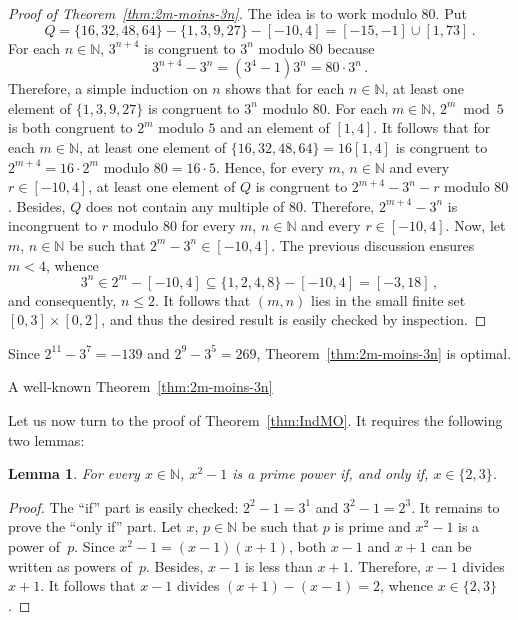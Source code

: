 \documentclass[12pt]{article}
\newcommand{\bZ}{\mathbb{Z}}
\newcommand{\bN}{\mathbb{N}} %
\newtheorem{lemma}{Lemma}
\theoremstyle{definition}
\begin{document}
   \begin{proof}[Proof of Theorem~\ref{thm:2m-moins-3n}]
     The idea is to work modulo $80$.
     Put  
     $$
     Q  = \{ 16, 32, 48, 64 \}  - \{ 1, 3, 9, 27 \}  - [- 10, 4] = [-15, - 1] \cup [1, 73] \,.
     $$
     For each $n \in \bN$,
     $3^{n + 4}$ is congruent to $3^n$ modulo $80$ because 
     $$3^{n + 4} - 3^n =  (3^4 - 1) 3^n = 80 \cdot  3^n \, .
     $$
     Therefore,
     a simple induction on $n$ shows that for each $n \in \bN$,
     at least one element of $\{ 1, 3, 9, 27 \}$ is congruent to $3^n$ modulo $80$.
     For each $m \in \bN$,
     $2^m \bmod 5$
     is both congruent to $2^m$ modulo $5$ and an element of $[1, 4]$.
     It follows that for each $m \in \bN$,
     at least one element of
     $\{ 16, 32, 48, 64 \} = 16 [1, 4]$ is congruent to $2^{m + 4}  = 16  \cdot 2^m$ modulo $80 = 16 \cdot 5$.
     Hence, for every $m$, $n \in \bN$ and every $r \in [-10, 4]$, 
     at least one element of $Q$ is congruent to $2^{m + 4} - 3^n - r$ modulo $80$.
     Besides, $Q$ does not contain any multiple of $80$.
     Therefore,
     $2^{m + 4}  - 3^n$ is incongruent to $r$ modulo $80$
     for every $m$, $n \in \bN$ and every $r \in [- 10, 4]$.
     Now, let $m$, $n \in \bN$ be such that $2^m - 3^n \in [-10, 4]$.
     The previous discussion ensures $m < 4$,
     whence  
     $$
     3^n \in 2^m - [- 10, 4] \subseteq \{ 1, 2, 4, 8 \} - [- 10, 4] = [ -3, 18] \, ,
     $$
     and consequently, $n \le 2$.
     It follows that $(m, n)$ lies in the small finite set $[0, 3] \times [0, 2]$,
     and thus the desired result is easily checked by inspection.
   \end{proof}

   Since $2^{11} - 3^7 = - 139$ and $2^9 - 3^5 = 269$,
   Theorem~\ref{thm:2m-moins-3n} is optimal.
   
   A well-known Theorem~\ref{thm:2m-moins-3n} 
   
   Let us now turn to the proof of Theorem~\ref{thm:IndMO}.
   It requires the following two lemmas:

     \begin{lemma} \label{lem:x2=q+1}
       For every $x \in \bN$, $x^2 - 1$ is a prime power if, and only if, $x \in \{ 2, 3 \}$. 
     \end{lemma}

     \begin{proof}
       The ``if'' part is easily checked: $2^2 - 1 = 3^1$ and $3^2 - 1 = 2^3$. 
       It remains to prove the ``only if'' part.
       Let $x$, $p \in \bN$ be such that $p$ is prime and $x^2 - 1$ is a power of~$p$.
       Since  $x^2 - 1 = (x - 1)(x + 1)$, 
       both $x - 1$ and $x + 1$ can be written as powers of~$p$.
       Besides, $x - 1$ is less than $x + 1$.
       Therefore, $x - 1$ divides $x + 1$.
       It follows that $x - 1$ divides $(x + 1) - (x - 1) = 2$,
       whence $x \in \{ 2, 3 \}$.
    \end{proof} 
    
\end{document}
